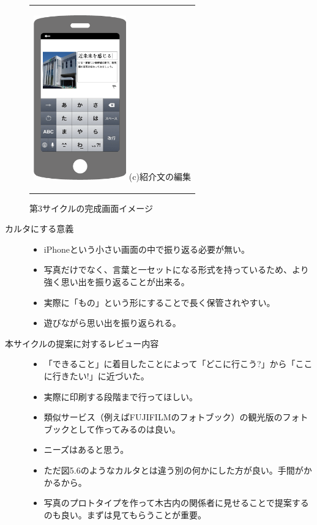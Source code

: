 \begin{figure}[htbp]
\begin{center}
\begin{tabular}{c}
      \begin{minipage}{0.33\hsize}
        \begin{center}
\includegraphics[width=4cm, bb=0 0 320 548]{appIdea3.png}
          \hspace{1cm} (c)紹介文の編集
        \end{center}
      \end{minipage}

    \end{tabular}
    \caption{第3サイクルの完成画面イメージ}
    \label{fig:lena}
  \end{center}
\end{figure}

\begin{description}
\item[カルタにする意義]\mbox{}
 \begin{itemize}
 \item iPhoneという小さい画面の中で振り返る必要が無い。
 \item 写真だけでなく、言葉と一セットになる形式を持っているため、より強く思い出を振り返ることが出来る。
 \item 実際に「もの」という形にすることで長く保管されやすい。
 \item 遊びながら思い出を振り返られる。
 \end{itemize}
\item[本サイクルの提案に対するレビュー内容]\mbox{}
 \begin{itemize}
 \item 「できること」に着目したことによって「どこに行こう?」から「ここに行きたい!」に近づいた。
 \item 実際に印刷する段階まで行ってほしい。
 \item 類似サービス（例えばFUJIFILMのフォトブック）の観光版のフォトブックとして作ってみるのは良い。
 \item ニーズはあると思う。
 \item ただ図5.6のようなカルタとは違う別の何かにした方が良い。手間がかかるから。
 \item 写真のプロトタイプを作って木古内の関係者に見せることで提案するのも良い。まずは見てもらうことが重要。
 \end{itemize}
\end{description}

